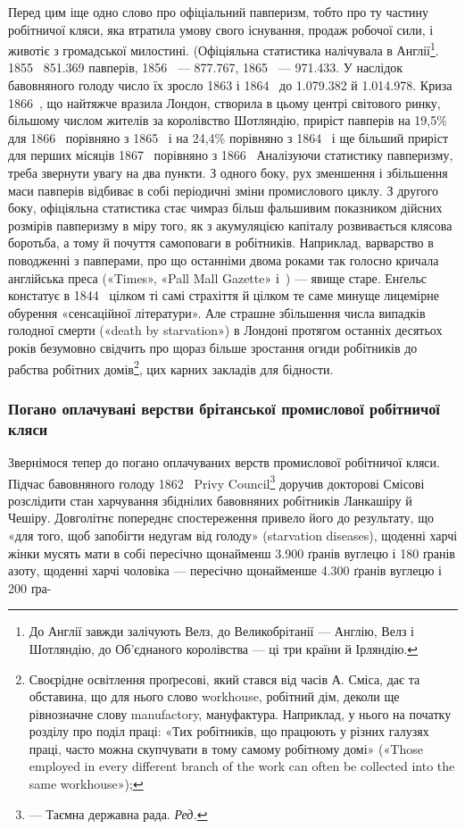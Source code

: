 Перед цим іще одно слово про офіціальний павперизм, тобто
про ту частину робітничої кляси, яка втратила умову свого існування,
продаж робочої сили, і животіє з громадської милостині.
(Офіціяльна статистика налічувала в Англії\footnote{
До Англії завжди залічують Велз, до Великобрітанії — Англію,
Велз і Шотляндію, до Об’єднаного королівства — ці три країни й Ірляндію.
}. 1855~ \num{851.369} павперів,
1856~ — \num{877.767}, 1865~ — \num{971.433}. У наслідок бавовняного
голоду число їх зросло 1863 і 1864~ до \num{1.079.382}
й \num{1.014.978}. Криза 1866~, що найтяжче вразила Лондон, створила
в цьому центрі світового ринку, більшому числом жителів
за королівство Шотляндію, приріст павперів на 19,5\% для
1866~ порівняно з 1865~ і на 24,4\% порівняно з 1864~ і ще
більший приріст для перших місяців 1867~ порівняно з
1866~ Аналізуючи статистику павперизму, треба звернути увагу
на два пункти. З одного боку, рух зменшення і збільшення маси
павперів відбиває в собі періодичні зміни промислового циклу.
З другого боку, офіціяльна статистика стає чимраз більш фальшивим
показником дійсних розмірів павперизму в міру того,
як з акумуляцією капіталу розвивається клясова боротьба, а
тому й почуття самоповаги в робітників. Наприклад, варварство
в поводженні з павперами, про що останніми двома роками так
голосно кричала англійська преса («Times», «Pall Mall Gazette»
і~) — явище старе. Енґельс констатує в 1844~ цілком
ті самі страхіття й цілком те саме минуще лицемірне обурення
«сенсаційної літератури». Але страшне збільшення числа випадків
голодної смерти («death by starvation») в Лондоні протягом
останніх десятьох років безумовно свідчить про щораз більше зростання
огиди робітників до рабства робітних домів\footnote{
Своєрідне освітлення проґресові, який стався від часів А. Сміса,
дає та обставина, що для нього слово workhouse, робітний дім, деколи ще
рівнозначне слову manufactory, мануфактура. Наприклад, у нього на
початку розділу про поділ праці: «Тих робітників, що працюють у різних
галузях праці, часто можна скупчувати в тому самому робітному домі»
(«Those employed in every different branch of the work can often be collected
into the same workhouse»);
}, цих карних
закладів для бідности.

\subsubsection{Погано оплачувані верстви брітанської промислової робітничої
кляси}

Звернімося тепер до погано оплачуваних верств промислової
робітничої кляси. Підчас бавовняного голоду 1862~ Privy
Council\footnote*{
— Таємна державна рада. \emph{Ред.}
} доручив докторові Смісові розслідити стан харчування
збіднілих бавовняних робітників Ланкашіру й Чешіру. Довголітнє
попереднє спостереження привело його до результату, що
«для того, щоб запобігти недугам від голоду» (starvation diseases),
щоденні харчі жінки мусять мати в собі пересічно щонайменш
\num{3.900} ґранів вуглецю і 180 ґранів азоту, щоденні харчі
чоловіка — пересічно щонайменше \num{4.300} ґранів вуглецю і 200 ґра-
\parbreak{}  %
